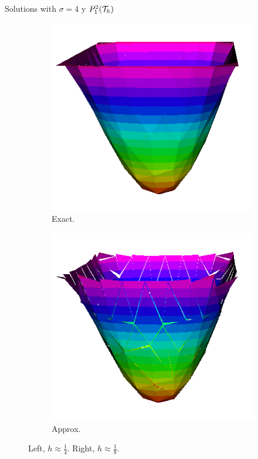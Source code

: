 \begin{frame}{Solutions with $\sigma=4$ y $\relax{P}^2_1(\mathcal{T}_h)$}
\begin{figure}[h!]
\begin{subfigure}[b]{0.1\textwidth}
			\end{subfigure}
			\begin{subfigure}[b]{0.2\textwidth}
				\centering
				\includegraphics[scale=0.16]{img/Difusion/Recortes/steady_diffusion_exact_n_8.png}
				\caption{\scriptsize Exact.}
			\end{subfigure}
			\begin{subfigure}[b]{0.2\textwidth}
				\centering
				\includegraphics[scale=0.16]{img/Difusion/Recortes/steady_diffusion_approx_n_8.png}
				\caption{\scriptsize Approx.}
			\end{subfigure}
			\caption{\scriptsize Left, $h\approx\frac{1}{4}$. Right, $h\approx\frac{1}{8}$.}
		\end{figure}


\end{frame}
